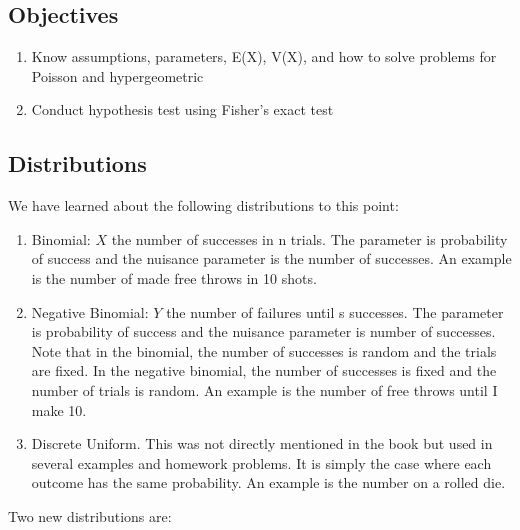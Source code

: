 \documentclass[]{book}
\providecommand{\tightlist}{%
  \setlength{\itemsep}{0pt}\setlength{\parskip}{0pt}}
\theoremstyle{definition}
\theoremstyle{definition}
\theoremstyle{definition}
\theoremstyle{remark}
\begin{document}
\subsection{Objectives}\label{objectives-10}

\begin{enumerate}
\def\labelenumi{\arabic{enumi}.}
\tightlist
\item
  Know assumptions, parameters, E(X), V(X), and how to solve problems
  for Poisson and hypergeometric\\
\item
  Conduct hypothesis test using Fisher's exact test
\end{enumerate}

\subsection{Distributions}\label{distributions}

We have learned about the following distributions to this point:

\begin{enumerate}
\def\labelenumi{\arabic{enumi}.}
\tightlist
\item
  Binomial: \(X\) the number of successes in n trials. The parameter is
  probability of success and the nuisance parameter is the number of
  successes. An example is the number of made free throws in 10 shots.\\
\item
  Negative Binomial: \(Y\) the number of failures until s successes. The
  parameter is probability of success and the nuisance parameter is
  number of successes. Note that in the binomial, the number of
  successes is random and the trials are fixed. In the negative
  binomial, the number of successes is fixed and the number of trials is
  random. An example is the number of free throws until I make 10.\\
\item
  Discrete Uniform. This was not directly mentioned in the book but used
  in several examples and homework problems. It is simply the case where
  each outcome has the same probability. An example is the number on a
  rolled die.
\end{enumerate}

Two new distributions are:
\end{document}
